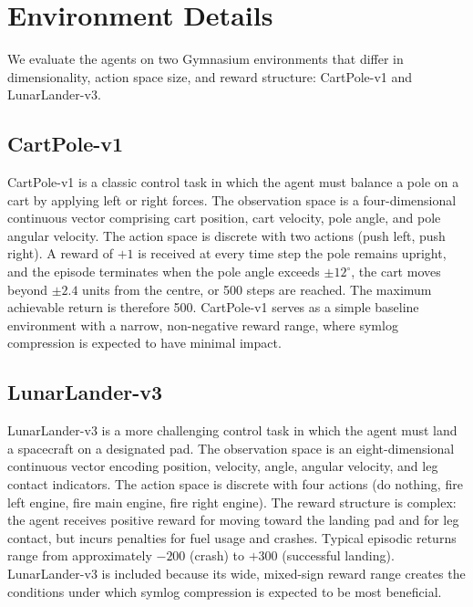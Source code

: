 \section{Environment Details}
\label{sec:method_envs}

We evaluate the agents on two Gymnasium environments that differ in dimensionality,
action space size, and reward structure: CartPole-v1 and LunarLander-v3.

\subsection{CartPole-v1}
\label{subsec:method_cartpole}

CartPole-v1 is a classic control task in which the agent must balance a pole on a
cart by applying left or right forces. The observation space is a four-dimensional
continuous vector comprising cart position, cart velocity, pole angle, and pole
angular velocity. The action space is discrete with two actions (push left, push
right). A reward of $+1$ is received at every time step the pole remains upright,
and the episode terminates when the pole angle exceeds $\pm 12^\circ$, the cart
moves beyond $\pm 2.4$ units from the centre, or 500 steps are reached. The
maximum achievable return is therefore 500. CartPole-v1 serves as a simple
baseline environment with a narrow, non-negative reward range, where symlog
compression is expected to have minimal impact.

\subsection{LunarLander-v3}
\label{subsec:method_lunarlander}

LunarLander-v3 is a more challenging control task in which the agent must land a
spacecraft on a designated pad. The observation space is an eight-dimensional
continuous vector encoding position, velocity, angle, angular velocity, and leg
contact indicators. The action space is discrete with four actions (do nothing,
fire left engine, fire main engine, fire right engine). The reward structure is
complex: the agent receives positive reward for moving toward the landing pad and
for leg contact, but incurs penalties for fuel usage and crashes. Typical episodic
returns range from approximately $-200$ (crash) to $+300$ (successful landing).
LunarLander-v3 is included because its wide, mixed-sign reward range creates the
conditions under which symlog compression is expected to be most beneficial.

